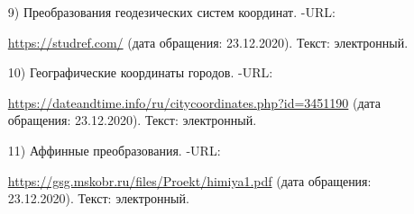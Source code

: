 \documentclass[14pt, a4paper]{extarticle}
\begin{document}
\begin{enumerate}
		\item[9)] Преобразования геодезических систем координат. -URL:\par
		\href{https://studref.com/}{https://studref.com/} (дата обращения: 23.12.2020). Текст: электронный.
		
		\item[10)] Географические координаты городов. -URL:\par
		\href{https://dateandtime.info/ru/citycoordinates.php?id=3451190}{https://dateandtime.info/ru/citycoordinates.php?id=3451190} (дата обращения: 23.12.2020). Текст: электронный.
		
		\item[11)] Аффинные преобразования. -URL:\par
		\href{https://gsg.mskobr.ru/files/Proekt/himiya1.pdf}{https://gsg.mskobr.ru/files/Proekt/himiya1.pdf} (дата обращения: 23.12.2020). Текст: электронный.
		
		
	\end{enumerate}
\end{document}
